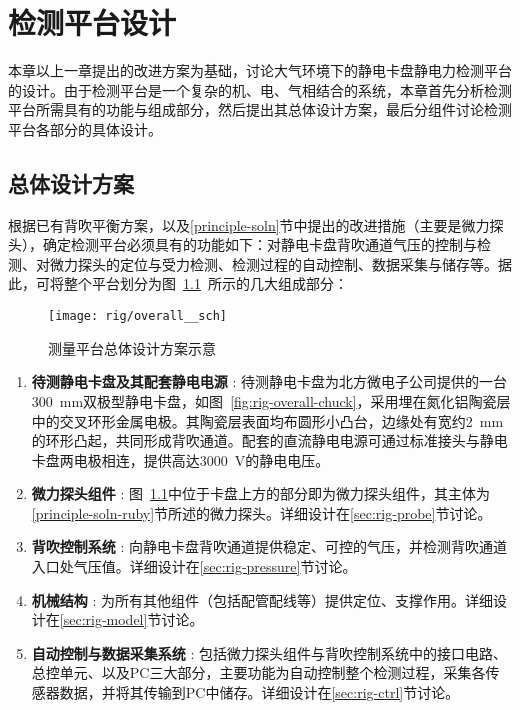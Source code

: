 \cleardoublepage
\chapter{检测平台设计}\label{ch:rig}

本章以上一章提出的改进方案为基础，讨论大气环境下的静电卡盘静电力检测平台的设计。由于检测平台是一个复杂的机、电、气相结合的系统，本章首先分析检测平台所需具有的功能与组成部分，然后提出其总体设计方案，最后分组件讨论检测平台各部分的具体设计。



\section{总体设计方案}\label{sec:rig-overall}

根据已有背吹平衡方案，以及\ref{principle-soln}节中提出的改进措施（主要是微力探头），确定检测平台必须具有的功能如下：对静电卡盘背吹通道气压的控制与检测、对微力探头的定位与受力检测、检测过程的自动控制、数据采集与储存等。据此，可将整个平台划分为图~\ref{fig:rig-overall-sch}~所示的几大组成部分：

\begin{figure}[tbh]
\centering
\texttt{[image: rig/overall\_\_sch]}
\caption{测量平台总体设计方案示意}
\label{fig:rig-overall-sch}
\end{figure}

\begin{enumerate}
  \item \textbf{待测静电卡盘及其配套静电电源} :
    待测静电卡盘为北方微电子公司提供的一台\SI{300}{\mm}双极型静电卡盘，如图~\ref{fig:rig-overall-chuck}，采用埋在氮化铝陶瓷层中的交叉环形金属电极。其陶瓷层表面均布圆形小凸台，边缘处有宽约\SI{2}{\mm}的环形凸起，共同形成背吹通道。配套的直流静电电源可通过标准接头与静电卡盘两电极相连，提供高达\SI{3000}{\V}的静电电压。
  \item \textbf{微力探头组件} :
    图~\ref{fig:rig-overall-sch}中位于卡盘上方的部分即为微力探头组件，其主体为\ref{principle-soln-ruby}节所述的微力探头。详细设计在\ref{sec:rig-probe}节讨论。
  \item \textbf{背吹控制系统} :
    向静电卡盘背吹通道提供稳定、可控的气压，并检测背吹通道入口处气压值。详细设计在\ref{sec:rig-pressure}节讨论。
  \item \textbf{机械结构} :
    为所有其他组件（包括配管配线等）提供定位、支撑作用。详细设计在\ref{sec:rig-model}节讨论。
  \item \textbf{自动控制与数据采集系统} :
    包括微力探头组件与背吹控制系统中的接口电路、总控单元、以及PC三大部分，主要功能为自动控制整个检测过程，采集各传感器数据，并将其传输到PC中储存。详细设计在\ref{sec:rig-ctrl}节讨论。
\end{enumerate}

